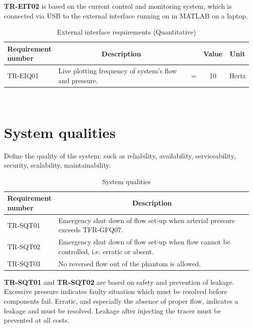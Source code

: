\textbf{TR-EIT02} is based on the current control and monitoring system, which is connected via USB to the external interface running on in MATLAB on a laptop.

\begin{table}[H]
\caption{External interface requirements (Quantitative)}
\label{tab:extint_quan}
\begin{tabular}{l|p{65mm}ccp{20mm}|}
	\makecell[l]{\textbf{Requirement} \\  \textbf{number}} & \multicolumn{1}{c}{\textbf{Description}} & \multicolumn{1}{c}{ } & \multicolumn{1}{c}{\textbf{Value}} & \multicolumn{1}{c}{\textbf{Unit}} \\
	\hline	
	TR-EIQ01 &  Live plotting frequency of system's flow and pressure. & = &  10 & Hertz \\
	\cline{2-5}
\end{tabular} \\
\end{table}

\section{System qualities}
Define the quality of the system: such as reliability, availability, serviceability, security, scalability, maintainability.
\begin{table} [H]
\caption{System qualities}
\label{tab:sysqual}
\begin{tabular}{l|p{120mm}|}
	\makecell[l]{\textbf{Requirement} \\ \textbf{number}} & \multicolumn{1}{c}{\textbf{Description}}\\
	\hline
	TR-SQT01 & Emergency shut down of flow set-up when arterial pressure exceeds TFR-GFQ07. \\ 
	TR-SQT02 & Emergency shut down of flow set-up when flow cannot be controlled, i.e. erratic or absent. \\
	TR-SQT03 & No reversed flow out of the phantom is allowed. \\
	\cline{2-2}
\end{tabular}
\end{table}

\textbf{TR-SQT01} and \textbf{TR-SQT02} are based on safety and prevention of leakage. Excessive pressure indicates faulty situation which must be resolved before components fail. Erratic, and especially the absence of proper flow, indicates a leakage and must be resolved. Leakage after injecting the tracer must be prevented at all costs.

